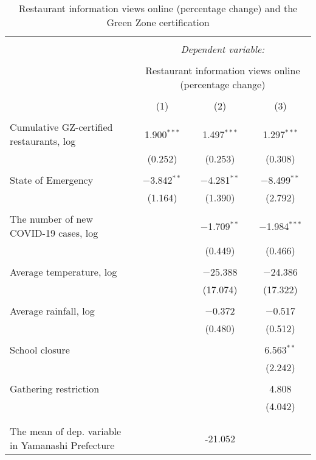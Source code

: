 
\begin{table}[!htbp] \centering 
  \caption{Restaurant information views online (percentage change) and the Green Zone certification} 
  \label{} 
\footnotesize 
\begin{tabular}{@{\extracolsep{1pt}}lccc} 
\\[-1.8ex]\hline 
\hline \\[-1.8ex] 
 & \multicolumn{3}{c}{\textit{Dependent variable:}} \\ 
\cline{2-4} 
\\[-1.8ex] & \multicolumn{3}{c}{Restaurant information views online (percentage change) } \\ 
\\[-1.8ex] & (1) & (2) & (3)\\ 
\hline \\[-1.8ex] 
 Cumulative GZ-certified restaurants, log & 1.900$^{***}$ & 1.497$^{***}$ & 1.297$^{***}$ \\ 
  & (0.252) & (0.253) & (0.308) \\ 
  & & & \\ 
 State of Emergency & $-$3.842$^{**}$ & $-$4.281$^{**}$ & $-$8.499$^{**}$ \\ 
  & (1.164) & (1.390) & (2.792) \\ 
  & & & \\ 
 The number of new COVID-19 cases, log &  & $-$1.709$^{**}$ & $-$1.984$^{***}$ \\ 
  &  & (0.449) & (0.466) \\ 
  & & & \\ 
 Average temperature, log &  & $-$25.388 & $-$24.386 \\ 
  &  & (17.074) & (17.322) \\ 
  & & & \\ 
 Average rainfall, log &  & $-$0.372 & $-$0.517 \\ 
  &  & (0.480) & (0.512) \\ 
  & & & \\ 
 School closure &  &  & 6.563$^{**}$ \\ 
  &  &  & (2.242) \\ 
  & & & \\ 
 Gathering restriction &  &  & 4.808 \\ 
  &  &  & (4.042) \\ 
  & & & \\ 
\hline \\[-1.8ex] 
The mean of dep. variable in Yamanashi Prefecture &  & -21.052 &  \\ 

\end{tabular}
\end{table}
